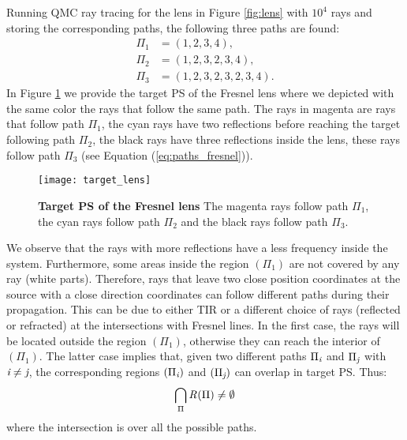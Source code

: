 Running QMC ray tracing for the lens in Figure \ref{fig:lens} with $10^4$ rays and storing the corresponding paths, the following three paths are found:
\begin{equation}\label{eq:paths_fresnel}
\begin{aligned}
\Pi_1 & = (1,2,3,4),\\
\Pi_2 & = (1,2,3,2,3,4), \\
\Pi_3 & = (1,2,3,2,3,2,3,4).
\end{aligned}
\end{equation}
In Figure \ref{fig:target_PS_lens} we provide the target PS of the Fresnel lens where we depicted with the same color the rays that follow the same path. The rays in magenta are rays that follow path $\Pi_1$, the cyan rays have two reflections before reaching the target following path $\Pi_2$, the black rays have three reflections inside the lens, these rays follow path $\Pi_3$ (see Equation (\ref{eq:paths_fresnel})).
\begin{figure}[h]
  \begin{center}
  \texttt{[image: target\_lens]}
  \end{center}
  \caption{\textbf{Target PS of the Fresnel lens}
The magenta rays follow path $\Pi_1$, the cyan rays follow path $\Pi_2$ and the black rays follow path $\Pi_3$.}
\label{fig:target_PS_lens}
 \end{figure}
We observe that the rays with more reflections have a less frequency inside the system. Furthermore, some areas inside the region $(\Pi_1)$ are not covered by any ray (white parts). Therefore, rays that leave two close position coordinates at the source with a close direction coordinates can follow different paths during their propagation. This can be due to either TIR or a different choice of rays (reflected or refracted) at the intersections with Fresnel lines. In the first case, the rays will be located outside the region $(\Pi_1)$, otherwise they can reach the interior of $(\Pi_1)$. The latter case implies that, given two different paths $\Pi_{\textit{i}}$ and $\Pi_{\textit{j}}$ with $\textit{i}\neq\textit{j}$, the corresponding regions $(\Pi_{\textit{i}})$ and $(\Pi_{\textit{j}})$ can overlap in target PS. Thus:
\begin{equation}
\bigcap_{\Pi}\mbox{$\emph{R}_{\textit{}}$}(\Pi)\neq \emptyset
\end{equation}
where the intersection is over all the possible paths. 
